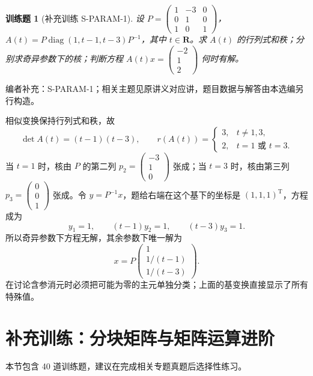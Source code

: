 \documentclass[12pt,fontset=fandol]{ctexart}
\newtheorem{exercise}{训练题}[section]
\begin{document}
\begin{exercise}[补充训练 S-PARAM-1]\label{prob:S-PARAM-1}
设 $P=\begin{pmatrix}1&-3&0\\0&1&0\\1&0&1\end{pmatrix}$，$A(t)=P\operatorname{diag}(1,t-1,t-3)P^{-1}$，其中 $t\in\mathbf R$。求 $A(t)$ 的行列式和秩；分别求奇异参数下的核；判断方程 $A(t)x=\begin{pmatrix}-2\\1\\2\end{pmatrix}$ 何时有解。
\end{exercise}
\noindent 编者补充：S-PARAM-1；相关主题见原讲义对应讲，题目数据与解答由本选编另行构造。
\begin{solve}
相似变换保持行列式和秩，故
\[\det A(t)=(t-1)(t-3),\qquad r(A(t))=\begin{cases}3,&t\ne1,3,\\2,&t=1\text{ 或 }t=3.\end{cases}\]
当 $t=1$ 时，核由 $P$ 的第二列 $p_2=\begin{pmatrix}-3\\1\\0\end{pmatrix}$ 张成；当 $t=3$ 时，核由第三列 $p_3=\begin{pmatrix}0\\0\\1\end{pmatrix}$ 张成。令 $y=P^{-1}x$，题给右端在这个基下的坐标是 $(1,1,1)^{\mathrm T}$，方程成为
\[y_1=1,\qquad(t-1)y_2=1,\qquad(t-3)y_3=1.\]
所以奇异参数下方程无解，其余参数下唯一解为
\[x=P\begin{pmatrix}1\\1/(t-1)\\1/(t-3)\end{pmatrix}.\]
在讨论含参消元时必须把可能为零的主元单独分类；上面的基变换直接显示了所有特殊值。
\end{solve}

\section{补充训练：分块矩阵与矩阵运算进阶}

本节包含 40 道训练题，建议在完成相关专题真题后选择性练习。
\end{document}
